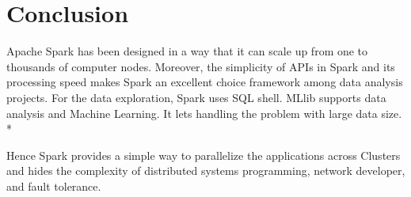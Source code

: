 \section{Conclusion}
\label{sec:conclusion}

Apache Spark has been designed in a way that it can scale up from one to thousands of computer nodes. 
Moreover, the simplicity of APIs in Spark and its processing speed makes Spark an excellent choice framework among data analysis projects. For the data exploration, Spark uses SQL shell. MLlib supports data analysis and Machine Learning. It lets handling the problem with large data size.\\*

Hence Spark provides a simple way to parallelize the applications across Clusters and hides the complexity of distributed systems programming, network developer, and fault tolerance.